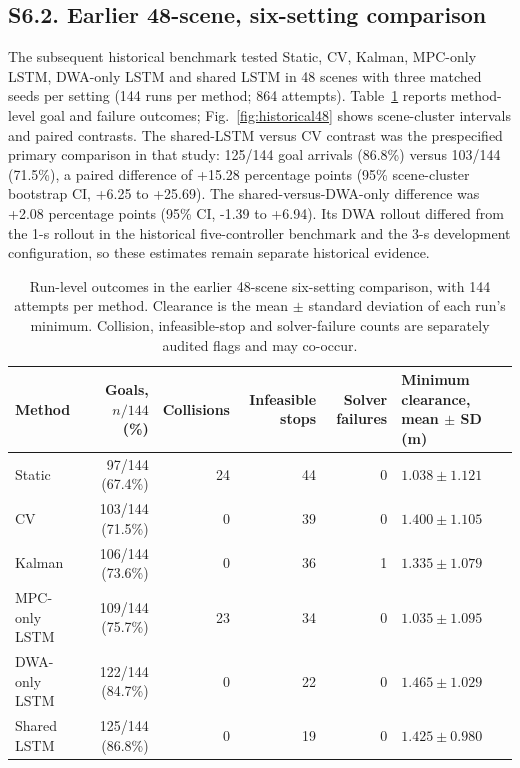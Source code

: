 \documentclass[10pt]{article}
\begin{document}
\subsection*{S6.2. Earlier 48-scene, six-setting comparison}
The subsequent historical benchmark tested Static, CV, Kalman, MPC-only LSTM, DWA-only LSTM and shared LSTM in 48 scenes with three matched seeds per setting (144 runs per method; 864 attempts). Table~\ref{tab:historical48} reports method-level goal and failure outcomes; Fig.~\ref{fig:historical48} shows scene-cluster intervals and paired contrasts. The shared-LSTM versus CV contrast was the prespecified primary comparison in that study: 125/144 goal arrivals (86.8\%) versus 103/144 (71.5\%), a paired difference of +15.28 percentage points (95\% scene-cluster bootstrap CI, +6.25 to +25.69). The shared-versus-DWA-only difference was +2.08 percentage points (95\% CI, -1.39 to +6.94). Its DWA rollout differed from the 1-s rollout in the historical five-controller benchmark and the 3-s development configuration, so these estimates remain separate historical evidence.

\begin{table}[htbp]
\centering
\caption{Run-level outcomes in the earlier 48-scene six-setting comparison, with 144 attempts per method. Clearance is the mean $\pm$ standard deviation of each run's minimum. Collision, infeasible-stop and solver-failure counts are separately audited flags and may co-occur.}
\label{tab:historical48}
\footnotesize
\renewcommand{\arraystretch}{1.14}
\setlength{\tabcolsep}{3.5pt}
\begin{tabularx}{\linewidth}{@{}l r r r r >{\raggedleft\arraybackslash}X@{}}
\toprule
Method & Goals, $n/144$ (\%) & Collisions & Infeasible stops & Solver failures & Minimum clearance, mean $\pm$ SD (m) \\
\midrule
Static & 97/144 (67.4\%) & 24 & 44 & 0 & $1.038\pm1.121$ \\
CV & 103/144 (71.5\%) & 0 & 39 & 0 & $1.400\pm1.105$ \\
Kalman & 106/144 (73.6\%) & 0 & 36 & 1 & $1.335\pm1.079$ \\
MPC-only LSTM & 109/144 (75.7\%) & 23 & 34 & 0 & $1.035\pm1.095$ \\
DWA-only LSTM & 122/144 (84.7\%) & 0 & 22 & 0 & $1.465\pm1.029$ \\
Shared LSTM & 125/144 (86.8\%) & 0 & 19 & 0 & $1.425\pm0.980$ \\
\bottomrule
\end{tabularx}
\end{table}
\end{document}
